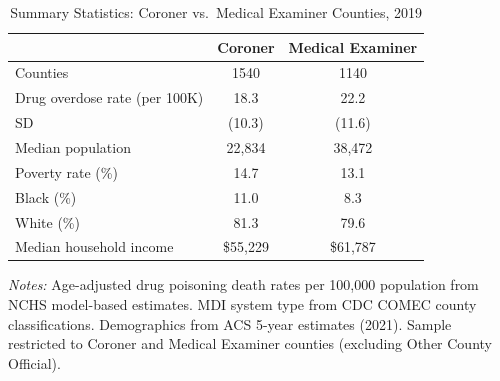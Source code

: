 \begin{table}[t]
\centering
\caption{Summary Statistics: Coroner vs.\ Medical Examiner Counties, 2019}
\label{tab:summary}
\small
\begin{tabular}{lcc}
\hline\hline
 & Coroner & Medical Examiner \\
\hline
Counties & 1540 & 1140 \\
Drug overdose rate (per 100K) & 18.3 & 22.2 \\
\quad SD & (10.3) & (11.6) \\
Median population & 22,834 & 38,472 \\
Poverty rate (\%) & 14.7 & 13.1 \\
Black (\%) & 11.0 & 8.3 \\
White (\%) & 81.3 & 79.6 \\
Median household income & \$55,229 & \$61,787 \\
\hline\hline
\end{tabular}
\begin{tablenotes}
\item \textit{Notes:} Age-adjusted drug poisoning death rates per 100,000 population from NCHS model-based estimates. MDI system type from CDC COMEC county classifications. Demographics from ACS 5-year estimates (2021). Sample restricted to Coroner and Medical Examiner counties (excluding Other County Official).
\end{tablenotes}
\end{table}
